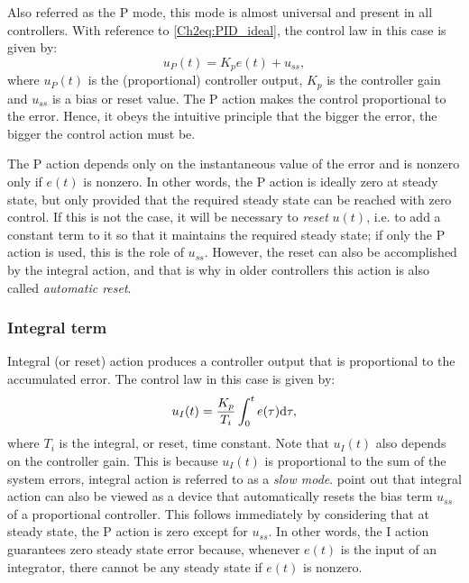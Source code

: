 Also referred as the P mode, this mode is almost universal and present in all controllers. With reference to \eqref{Ch2eq:PID_ideal}, the control law in this case is given by:
%
\begin{equation*}
u_P (t) = K_pe(t) + u_{ss},
\end{equation*}
%
where $u_P(t)$ is the (proportional) controller output, $K_p$ is the controller gain and $u_{ss}$ is a bias or reset value. The P action makes the control proportional to the error. Hence, it obeys the intuitive principle that the bigger the error, the bigger the control action must be.

The P action depends only on the instantaneous value of the error and is nonzero only if $e(t)$ is nonzero. In other words, the P action is ideally zero at steady state, but only provided that the required steady state can be reached with zero control. If this is not the case, it will be necessary to \emph{reset} $u(t)$, i.e. to add a constant term to it so that it maintains the required steady state; if only the P action is used, this is the role of $u_{ss}$. However, the reset can also be accomplished by the integral action, and that is why in older controllers this action is also called \emph{automatic reset}. 
%
\subsubsection*{Integral term}
%
Integral (or reset) action produces a controller output that is proportional to the accumulated error. The control law in this case is given by:
%
\begin{equation*}
	u_I( t ) = \frac{K_p}{T_i}\int_0^t e(\tau)\mathrm{d} \tau,
\end{equation*}
%
where $T_i$ is the integral, or reset, time constant. Note that $u_I(t)$ also depends on the controller gain. This is because  $u_I(t)$ is proportional to the sum of the system errors, integral action is referred to as a \emph{slow mode}. \citet{astromhagglund2006} point out that integral action can also be viewed as a device that automatically resets the bias term $u_{ss}$ of a proportional controller. This follows immediately by considering that at steady state, the P action is zero except for $u_{ss}$. In other words, the I action guarantees zero steady state error because, whenever $e(t)$ is the input of an integrator, there cannot be any steady state if $e(t)$ is nonzero.

